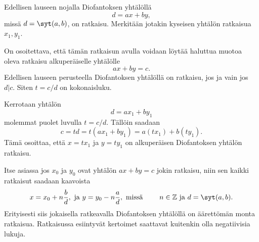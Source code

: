 
\begin{todistus}
Edellisen lauseen nojalla Diofantoksen yhtälöllä
\[
d= a x + b y,
\]
missä $d=\syt(a,b)$, on ratkaisu. Merkitään jotakin kyseisen yhtälön ratkaisua $x_1,y_1$.

On osoitettava, että tämän ratkaisun avulla voidaan löytää haluttua muotoa oleva ratkaisu alkuperäiselle yhtälölle
\[
a x + b y = c.
\]
Edellisen lauseen perusteella Diofantoksen yhtälöllä on ratkaisu, jos ja vain jos $d|c$. Siten $t=c/d$ on kokonaisluku.

Kerrotaan yhtälön
\[
d= a x_1 + b y_1
\]
molemmat puolet luvulla $t=c/d$. Tällöin saadaan
\[
c=td=t(a x_1 + b y_1) = a(tx_1)+ b(ty_1).
\]
Tämä osoittaa, että $x=tx_1$ ja $y=ty_1$ on alkuperäisen Diofantoksen yhtälön ratkaisu.
\end{todistus}

Itse asiassa jos $x_0$ ja $y_0$ ovat yhtälön $ax + by = c$ jokin ratkaisu, niin sen kaikki ratkaisut saadaan kaavoista
\[
x= x_0 + n\frac{b}{d}, \textrm{ ja } y=y_0 - n\frac{a}{d}, \textrm{ missä } \qquad n\in\mathbb{Z} \textrm{ ja } d=\syt(a,b).
\]
Erityisesti siis jokaisella ratkeavalla Diofantoksen yhtälöllä on äärettömän monta ratkaisua. Ratkaisussa esiintyvät kertoimet saattavat kuitenkin olla negatiivisia lukuja.

